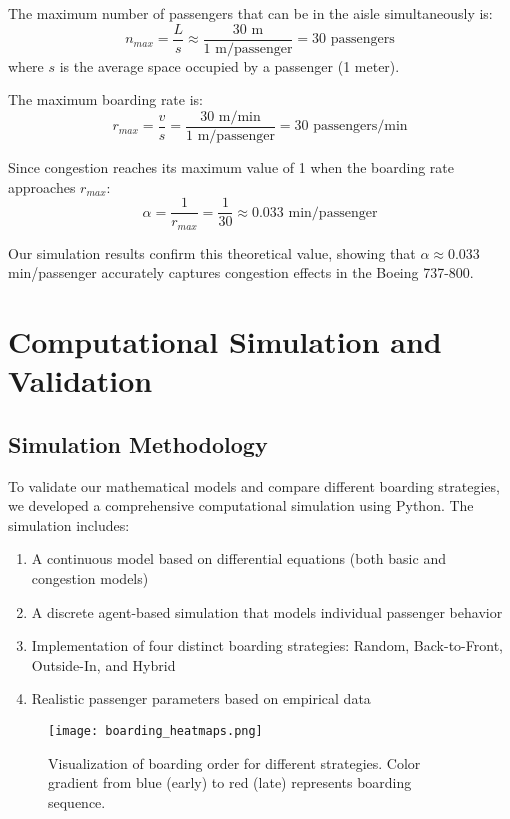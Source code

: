 \documentclass[12pt,a4paper]{article}
\begin{document}
The maximum number of passengers that can be in the aisle simultaneously is:
\begin{equation}
n_{max} = \frac{L}{s} \approx \frac{30 \text{ m}}{1 \text{ m/passenger}} = 30 \text{ passengers}
\end{equation}
where $s$ is the average space occupied by a passenger (1 meter).

The maximum boarding rate is:
\begin{equation}
r_{max} = \frac{v}{s} = \frac{30 \text{ m/min}}{1 \text{ m/passenger}} = 30 \text{ passengers/min}
\end{equation}

Since congestion reaches its maximum value of 1 when the boarding rate approaches $r_{max}$:
\begin{equation}
\alpha = \frac{1}{r_{max}} = \frac{1}{30} \approx 0.033 \text{ min/passenger}
\end{equation}

Our simulation results confirm this theoretical value, showing that $\alpha \approx 0.033$ min/passenger accurately captures congestion effects in the Boeing 737-800.

\section{Computational Simulation and Validation}

\subsection{Simulation Methodology}
To validate our mathematical models and compare different boarding strategies, we developed a comprehensive computational simulation using Python. The simulation includes:

\begin{enumerate}
    \item A continuous model based on differential equations (both basic and congestion models)
    \item A discrete agent-based simulation that models individual passenger behavior
    \item Implementation of four distinct boarding strategies: Random, Back-to-Front, Outside-In, and Hybrid
    \item Realistic passenger parameters based on empirical data
\end{enumerate}

\begin{figure}[H]
\centering
\texttt{[image: boarding\_heatmaps.png]}
\caption{Visualization of boarding order for different strategies. Color gradient from blue (early) to red (late) represents boarding sequence.}
\label{fig:boarding_heatmaps}
\end{figure}
\end{document}
